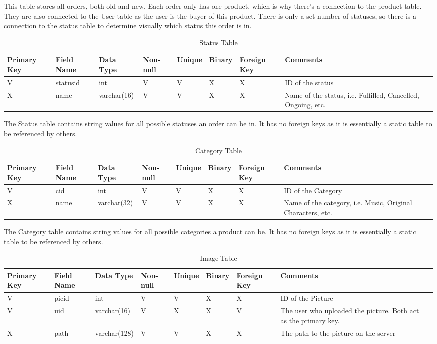 \documentclass[]{article}
\begin{document}
\begin{enumerate}
	This table stores all orders, both old and new. 
	Each order only has one product, which is why there's a connection to the product table. They are also connected to
	the User table as the user is the buyer of this product. There is only a set number of statuses, so there is a 
	connection to the status table to determine visually which status this order is in. 	

	\begin{table}[!h]
	\begin{tabular}{|p{1cm}|p{1cm}|p{2cm}|p{1cm}|p{1cm}|p{1cm}|p{1cm}|p{1cm}|p{4cm}|}
		\hline   Primary Key & Field Name & Data Type & Non-null & Unique & Binary & Foreign Key & Comments \\
		\hline V & statusid & int & V & V & X & X & ID of the status\\
		\hline X & name & varchar(16) & V & V & X & X & Name of the status, i.e. Fulfilled, Cancelled, Ongoing, etc.\\
	\end{tabular}
	\caption{Status Table}	
	\end{table}		

	The Status table contains string values for all possible statuses an order can be in.
	It has no foreign keys as it is essentially a static table to be referenced by others.

	\begin{table}[!h]
	\begin{tabular}{|p{1cm}|p{1cm}|p{2cm}|p{1cm}|p{1cm}|p{1cm}|p{1cm}|p{1cm}|p{4cm}|}
		\hline   Primary Key & Field Name & Data Type & Non-null & Unique & Binary & Foreign Key & Comments \\
		\hline V & cid & int & V & V & X & X & ID of the Category\\
		\hline X & name & varchar(32) & V & V & X & X & Name of the category, i.e. Music, Original Characters, etc.\\
	\end{tabular}
	\caption{Category Table}	
	\end{table}		

	The Category table contains string values for all possible categories a product can be.
	It has no foreign keys as it is essentially a static table to be referenced by others.	

	\begin{table}[!h]
	\begin{tabular}{|p{1cm}|p{1cm}|p{2cm}|p{1cm}|p{1cm}|p{1cm}|p{1cm}|p{1cm}|p{4cm}|}
		\hline   Primary Key & Field Name & Data Type & Non-null & Unique & Binary & Foreign Key & Comments \\
		\hline V & picid & int & V & V & X & X & ID of the Picture\\
		\hline V & uid & varchar(16) & V & X & X & V & The user who uploaded the picture. Both act as the primary key.\\
		\hline X & path & varchar(128) & V & V & X & X & The path to the picture on the server\\		
	\end{tabular}
	\caption{Image Table}	
	\end{table}	


\end{enumerate}
\end{document}
